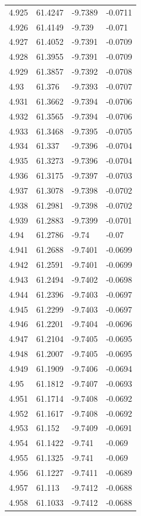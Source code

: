 \begin{tabular}{llll}
4.925 & 61.4247 & -9.7389 & -0.0711 \\
4.926 & 61.4149 & -9.739 & -0.071 \\
4.927 & 61.4052 & -9.7391 & -0.0709 \\
4.928 & 61.3955 & -9.7391 & -0.0709 \\
4.929 & 61.3857 & -9.7392 & -0.0708 \\
4.93 & 61.376 & -9.7393 & -0.0707 \\
4.931 & 61.3662 & -9.7394 & -0.0706 \\
4.932 & 61.3565 & -9.7394 & -0.0706 \\
4.933 & 61.3468 & -9.7395 & -0.0705 \\
4.934 & 61.337 & -9.7396 & -0.0704 \\
4.935 & 61.3273 & -9.7396 & -0.0704 \\
4.936 & 61.3175 & -9.7397 & -0.0703 \\
4.937 & 61.3078 & -9.7398 & -0.0702 \\
4.938 & 61.2981 & -9.7398 & -0.0702 \\
4.939 & 61.2883 & -9.7399 & -0.0701 \\
4.94 & 61.2786 & -9.74 & -0.07 \\
4.941 & 61.2688 & -9.7401 & -0.0699 \\
4.942 & 61.2591 & -9.7401 & -0.0699 \\
4.943 & 61.2494 & -9.7402 & -0.0698 \\
4.944 & 61.2396 & -9.7403 & -0.0697 \\
4.945 & 61.2299 & -9.7403 & -0.0697 \\
4.946 & 61.2201 & -9.7404 & -0.0696 \\
4.947 & 61.2104 & -9.7405 & -0.0695 \\
4.948 & 61.2007 & -9.7405 & -0.0695 \\
4.949 & 61.1909 & -9.7406 & -0.0694 \\
4.95 & 61.1812 & -9.7407 & -0.0693 \\
4.951 & 61.1714 & -9.7408 & -0.0692 \\
4.952 & 61.1617 & -9.7408 & -0.0692 \\
4.953 & 61.152 & -9.7409 & -0.0691 \\
4.954 & 61.1422 & -9.741 & -0.069 \\
4.955 & 61.1325 & -9.741 & -0.069 \\
4.956 & 61.1227 & -9.7411 & -0.0689 \\
4.957 & 61.113 & -9.7412 & -0.0688 \\
4.958 & 61.1033 & -9.7412 & -0.0688 \\

\end{tabular}
